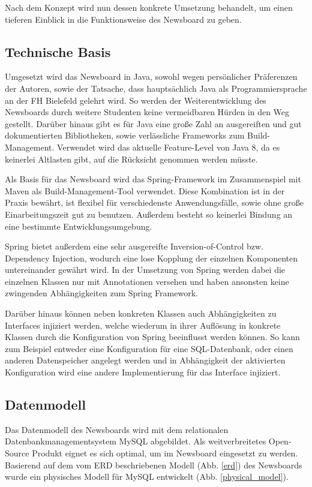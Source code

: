 Nach dem Konzept wird nun dessen konkrete Umsetzung behandelt,
um einen tieferen Einblick in die Funktionsweise des Newsboard zu geben.

\subsection{Technische Basis}
Umgesetzt wird das Newsboard in Java, sowohl wegen persönlicher Präferenzen der Autoren,
sowie der Tatsache, dass hauptsächlich Java als Programmiersprache
an der FH Bielefeld gelehrt wird. So werden der Weiterentwicklung des Newsboards
durch weitere Studenten keine vermeidbaren Hürden in den Weg gestellt.
Darüber hinaus gibt es für Java eine große Zahl an ausgereiften
und gut dokumentierten Bibliotheken, sowie verlässliche Frameworks zum 
Build-Management. Verwendet wird das aktuelle Feature-Level von Java 8,
da es keinerlei Altlasten gibt, auf die Rücksicht genommen werden müsste.

Als Basis für das Newsboard wird das Spring-Framework im Zusammenspiel mit Maven
als Build-Management-Tool verwendet. Diese Kombination ist in der Praxis bewährt,
ist flexibel für verschiedenste Anwendungsfälle, sowie ohne große Einarbeitungszeit
gut zu benutzen. Außerdem besteht so keinerlei Bindung
an eine bestimmte Entwicklungsumgebung.

Spring bietet außerdem eine sehr ausgereifte Inversion-of-Control bzw.
Dependency Injection, wodurch eine lose Kopplung der einzelnen Komponenten
untereinander gewährt wird\cite{fowler-ioc}.
In der Umsetzung von Spring werden dabei die einzelnen Klassen nur mit
Annotationen versehen und haben ansonsten keine zwingenden Abhängigkeiten
zum Spring Framework.

Darüber hinaus können neben konkreten Klassen auch Abhängigkeiten zu Interfaces
injiziert werden, welche wiederum in ihrer Auflösung in konkrete Klassen
durch die Konfiguration von Spring beeinflusst werden können.
So kann zum Beispiel entweder eine Konfiguration für eine SQL-Datenbank,
oder einen anderen Datenspeicher angelegt werden und in Abhängigkeit
der aktivierten Konfiguration wird eine andere Implementierung für das
Interface injiziert.

\subsection{Datenmodell}
Das Datenmodell des Newsboards wird mit dem relationalen Datenbankmanagementsystem MySQL
abgebildet. Als weitverbreitetes Open-Source Produkt eignet es sich optimal, um im
Newsboard eingesetzt zu werden. Basierend auf dem vom ERD beschriebenen Modell
(Abb. \ref{erd}) des Newsboards wurde ein physisches Modell für MySQL entwickelt
(Abb. \ref{physical_model}).

